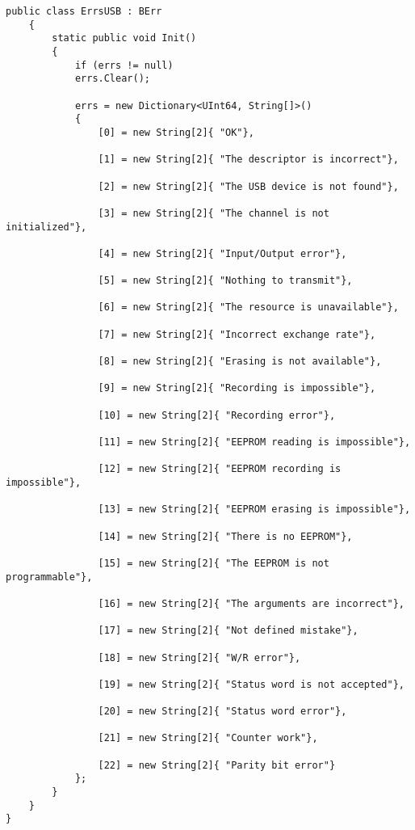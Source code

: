 \begin{lstlisting}[label=err,caption=Ошибки]
    public class ErrsUSB : BErr
	{
		static public void Init()
		{
			if (errs != null)
			errs.Clear();
			
			errs = new Dictionary<UInt64, String[]>()
			{
				[0] = new String[2]{ "OK"},
				
				[1] = new String[2]{ "The descriptor is incorrect"},
				
				[2] = new String[2]{ "The USB device is not found"},
				
				[3] = new String[2]{ "The channel is not initialized"},
				
				[4] = new String[2]{ "Input/Output error"},
				
				[5] = new String[2]{ "Nothing to transmit"},
				
				[6] = new String[2]{ "The resource is unavailable"},
				
				[7] = new String[2]{ "Incorrect exchange rate"},
				
				[8] = new String[2]{ "Erasing is not available"},
				
				[9] = new String[2]{ "Recording is impossible"},
				
				[10] = new String[2]{ "Recording error"},
				
				[11] = new String[2]{ "EEPROM reading is impossible"},
				
				[12] = new String[2]{ "EEPROM recording is impossible"},
				
				[13] = new String[2]{ "EEPROM erasing is impossible"},
				
				[14] = new String[2]{ "There is no EEPROM"},
				
				[15] = new String[2]{ "The EEPROM is not programmable"},
				
				[16] = new String[2]{ "The arguments are incorrect"},
				
				[17] = new String[2]{ "Not defined mistake"},
				
				[18] = new String[2]{ "W/R error"},
				
				[19] = new String[2]{ "Status word is not accepted"},
				
				[20] = new String[2]{ "Status word error"},
				
				[21] = new String[2]{ "Counter work"},
				
				[22] = new String[2]{ "Parity bit error"}
			};
		}
	}
}

\end{lstlisting}